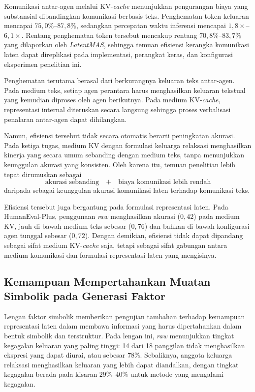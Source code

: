 Komunikasi antar-agen melalui KV-\textit{cache} menunjukkan pengurangan biaya yang
substansial dibandingkan komunikasi berbasis teks. Penghematan token keluaran
mencapai $75{,}0\%$--$87{,}8\%$, sedangkan percepatan waktu inferensi mencapai
$1{,}8\times$--$6{,}1\times$. Rentang penghematan token tersebut mencakup
rentang $70{,}8\%$--$83{,}7\%$ yang dilaporkan oleh \textit{LatentMAS}, sehingga temuan
efisiensi kerangka komunikasi laten dapat direplikasi pada implementasi,
perangkat keras, dan konfigurasi eksperimen penelitian ini.

Penghematan terutama berasal dari berkurangnya keluaran teks antar-agen.
Pada medium teks, setiap agen perantara harus menghasilkan keluaran tekstual
yang kemudian diproses oleh agen berikutnya. Pada medium KV-\textit{cache}, representasi
internal diteruskan secara langsung sehingga proses verbalisasi penalaran
antar-agen dapat dihilangkan.

Namun, efisiensi tersebut tidak secara otomatis berarti peningkatan akurasi.
Pada ketiga tugas, medium KV dengan formulasi keluarga relaksasi menghasilkan
kinerja yang secara umum sebanding dengan medium teks, tanpa menunjukkan
keunggulan akurasi yang konsisten. Oleh karena itu, temuan penelitian lebih
tepat dirumuskan sebagai
\[
\boxed{
\text{akurasi sebanding}
\quad+\quad
\text{biaya komunikasi lebih rendah}
}
\]
daripada sebagai keunggulan akurasi komunikasi laten terhadap komunikasi teks.

Efisiensi tersebut juga bergantung pada formulasi representasi laten. Pada
HumanEval-Plus, penggunaan \textit{raw} menghasilkan akurasi ($0{,}42$) pada
medium KV, jauh di bawah medium teks sebesar ($0{,}76$) dan bahkan di bawah
konfigurasi agen tunggal sebesar ($0{,}72$). Dengan demikian, efisiensi tidak
dapat dipandang sebagai sifat medium KV-\textit{cache} saja, tetapi sebagai sifat
gabungan antara medium komunikasi dan formulasi representasi laten yang
mengisinya.

\subsection{Kemampuan Mempertahankan Muatan Simbolik pada Generasi Faktor}

Lengan faktor simbolik memberikan pengujian tambahan terhadap kemampuan
representasi laten dalam membawa informasi yang harus dipertahankan dalam
bentuk simbolik dan terstruktur. Pada lengan ini, \textit{raw} menunjukkan
tingkat kegagalan keluaran yang paling tinggi: 14 dari 18 panggilan tidak
menghasilkan ekspresi yang dapat diurai, atau sebesar $78\%$. Sebaliknya,
anggota keluarga relaksasi menghasilkan keluaran yang lebih dapat diandalkan,
dengan tingkat kegagalan berada pada kisaran $29\%$--$40\%$ untuk metode
yang mengalami kegagalan.

